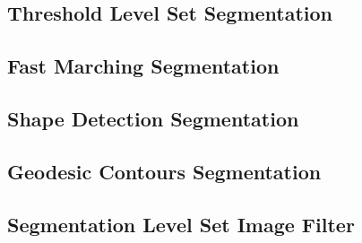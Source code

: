 %
%
% 
%
%
%



\subsection{Threshold Level Set Segmentation}

\subsection{Fast Marching Segmentation}

\subsection{Shape Detection Segmentation}

\subsection{Geodesic Contours Segmentation}



\subsection{Segmentation Level Set Image Filter}
\label{sec:SegmentationLevelSetImageFilter}


